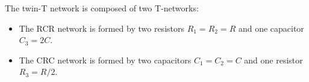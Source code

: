 \documentclass{article}
\begin{document}
The twin-T network is composed of two T-networks: 
\begin{itemize}
\item The RCR network is formed by two resistors $R_1=R_2=R$ and one
  capacitor $C_3=2C$. 

  \begin{comment}
  This T (or Y) network can be converted to a $\pi$ (or $\Delta$) network (see 
  \htmladdnormallink{here}{http://fourier.eng.hmc.edu/e84/lectures/ch2/node3.html}) of three branches:
  \begin{equation}
  Z'_1=Z'_2=R+\frac{1}{2j\omega C}+\frac{R/2j\omega C}{R}
  =R+\frac{1}{j\omega C}=\frac{j\omega RC+1}{j\omega C}
  \end{equation}
  \begin{equation}
  Z'_3=R+R+\frac{R^2}{1/2j\omega C}=2R+2R^2j\omega C=2R(1+j\omega RC)
  \end{equation}
  The frequency response function of the voltage divider formed by 
  $Z'_3$ and $Z'_2$ is:
  \begin{eqnarray}
  H'(j\omega)&=&\frac{Z'_2}{Z'_2+Z'_3}
  =\frac{(1+j\omega RC)/j\omega C}{(1+j\omega RC)/j\omega C+2R(1+j\omega RC)}
  \nonumber\\
  &=&\frac{1}{1+2j\omega RC}=\frac{1}{1+2j\omega\tau}
  \end{eqnarray}
  where $\tau=RC$. This is a first-order low-pass filter with cut-off
  frequency at $\omega_c=1/2\tau$:
  \begin{equation}
  |H'(j\omega)|=\left\{\begin{array}{ll}1 & \omega=0\\1/\sqrt{2}& 
  \omega=1/2\tau\\ 0&\omega\rightarrow\infty\end{array}\right.
  \end{equation}
  \end{comment}

\item The CRC network is formed by two capacitors $C_1=C_2=C$ and one
  resistor $R_3=R/2$. 


\end{itemize}
\end{document}
